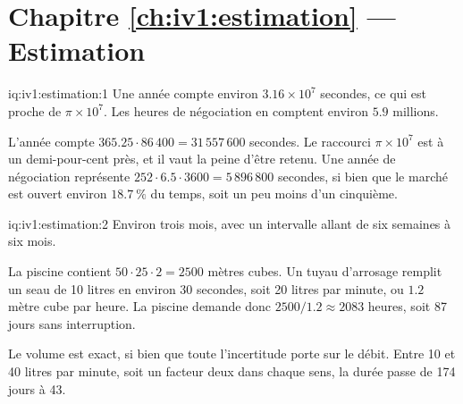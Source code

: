 \section*{Chapitre \ref{ch:iv1:estimation} --- Estimation}

\begin{solution}{iq:iv1:estimation:1}
Une année compte environ $3.16 \times 10^7$ secondes, ce qui est proche de $\pi \times 10^7$. Les heures de négociation en comptent environ $5.9$ millions.

L'année compte $365.25 \cdot 86\,400 = 31\,557\,600$ secondes. Le raccourci $\pi \times 10^7$ est à un demi-pour-cent près, et il vaut la peine d'être retenu. Une année de négociation représente $252 \cdot 6.5 \cdot 3600 = 5\,896\,800$ secondes, si bien que le marché est ouvert environ $18.7~\%$ du temps, soit un peu moins d'un cinquième.

\end{solution}

\begin{solution}{iq:iv1:estimation:2}
Environ trois mois, avec un intervalle allant de six semaines à six mois.

La piscine contient $50 \cdot 25 \cdot 2 = 2500$ mètres cubes. Un tuyau d'arrosage remplit un seau de 10 litres en environ 30 secondes, soit 20 litres par minute, ou $1.2$ mètre cube par heure. La piscine demande donc $2500/1.2 \approx 2083$ heures, soit 87 jours sans interruption.

Le volume est exact, si bien que toute l'incertitude porte sur le débit. Entre 10 et 40 litres par minute, soit un facteur deux dans chaque sens, la durée passe de 174 jours à 43.

\end{solution}

